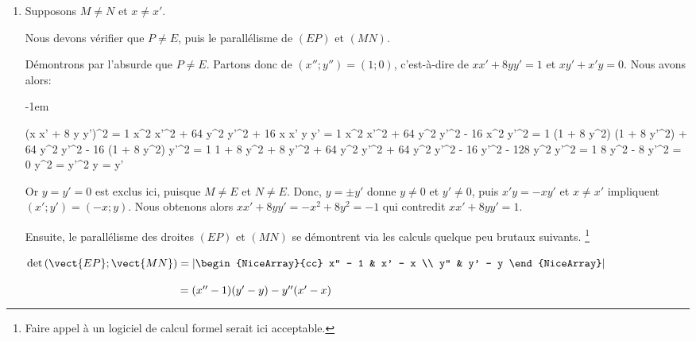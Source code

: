 \begin{enumerate}
	\item Supposons $M \neq N$ et $x \neq x'$.
	
	\smallskip
	
	\noindent
	Nous devons vérifier que $P \neq E$, puis le parallélisme de $(EP)$ et $(MN)$.
	
	\smallskip
		
	\noindent
	Démontrons par l'absurde que $P \neq E$. Partons donc de $(x'' ; y'') = (1 ; 0)$,
	c'est-à-dire de $x x' + 8 y y' = 1$ et $x y' + x' y = 0$.
	Nous avons alors:
	
	\medskip
	
	\noindent
	\kern-1em\begin{stepcalc}[style = ar*, ope = {\implies[donc]}]
	    (x x' + 8 y y')^2 = 1
	\explnext{}
	    x^2 x'^2 + 64 y^2 y'^2 + 16 x x' y y' = 1
	    x^2 x'^2 + 64 y^2 y'^2 - 16 x^2 y'^2 = 1
	      (1 + 8 y^2) (1 + 8 y'^2) 
	    + 64 y^2 y'^2 
	    - 16 (1 + 8 y^2) y'^2 
	    = 1
	\explnext{}
	      1 + 8 y^2 + 8 y'^2 + 64 y^2 y'^2 
	    + 64 y^2 y'^2 
	    - 16 y'^2 - 128 y^2 y'^2
	    = 1
	\explnext{}
	    8 y^2 - 8 y'^2 = 0
	\explnext{}
	    y^2 = y'^2
	\explnext{}
	    y = \pm y'
	\end{stepcalc}
	
	\medskip
		
	\noindent
	Or $y = y'= 0$ est exclus ici, puisque $M \neq E$ et $N \neq E$.
	Donc,
	$y = \pm y'$ donne $y \neq 0$ et $y'\neq 0$, puis $x' y = - x y'$ et $x \neq x'$ impliquent
	$(x' ; y') = (- x ; y)$.
	Nous obtenons alors
	$x x' + 8 y y' = - x^2 + 8 y^2 = -1$ qui contredit $x x' + 8 y y' = 1$.
	
	\smallskip
		
	\noindent
	Ensuite, le parallélisme des droites $(EP)$ et $(MN)$ se démontrent via les calculs quelque peu brutaux suivants.%
	\footnote{
	    Faire appel à un logiciel de calcul formel serait ici acceptable.
	}
	
	\smallskip
	
	\noindent
	$\det\left ( \vect{EP} ; \vect{MN} \right)
	=
	\left|\begin{NiceArray}{cc} 
	  x'' - 1 & x' - x \\ 
	  y''     & y' - y
	\end{NiceArray}\right|$
	
	\noindent
	$\phantom{\det\left ( \vect{EP} ; \vect{MN} \right)}
	=
	(x'' - 1)(y' - y) -  y'' (x' - x)$
	

\end{enumerate}
